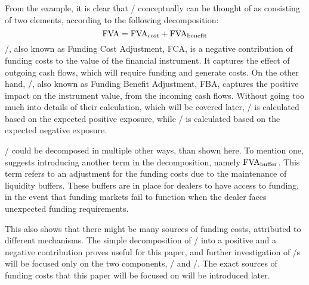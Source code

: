 \documentclass[main.tex]{subfiles}
\begin{document}
        From the example, it is clear that \FVA/ conceptually can be thought of 
        as consisting of two elements, according to the following decomposition:
        \begin{equation*}
            \FVA/ = \FCA/ + \FBA/
        \end{equation*}
        \FCA/, also known as Funding Cost Adjustment, FCA, 
        is a negative contribution of funding costs to the value of the financial instrument.
        It captures the effect of outgoing cash flows, which will require funding and generate costs.
        On the other hand, \FBA/, also known as Funding Benefit Adjustment, FBA, 
        captures the positive impact on the instrument value, from the incoming cash flows.
        Without going too much into details of their calculation, which will be covered later,
        \FCA/ is calculated based on the expected positive exposure, 
        while \FBA/ is calculated based on the expected negative exposure. 

        \FVA/ could be decomposed in multiple other ways, than shown here. 
        To mention one, \textcite{KPMGFVA} suggests introducing another term in the decomposition, 
        namely $\FVA/_{\text{buffer}}$.
        This term refers to an adjustment for the funding costs
        due to the maintenance of liquidity buffers. 
        These buffers are in place for dealers to have access to funding, in the event
        that funding markets fail to function when the dealer faces unexpected funding requirements.

        This also shows that there might be many sources of funding costs,
        attributed to different mechanisms.
        The simple decomposition of \FVA/ into a positive and a negative contribution
        proves useful for this paper,
        and further investigation of \FVA/s will be focused only on the two components,
        \FCA/ and \FBA/.
        The exact sources of funding costs that this paper will be focused on
        will be introduced later.
\end{document}
